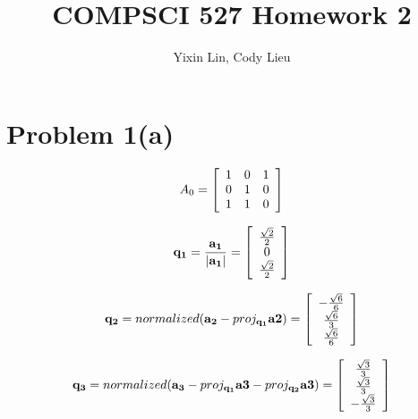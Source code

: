 \documentclass{article}
\author{Yixin Lin, Cody Lieu}
\title{COMPSCI 527 Homework 2}
\newif\ifstays
\begin{document}
\maketitle


\ifstays
\noindent [Please remove all the extra stuff below from the \verb#.tex# file before you hand in the resulting PDF file. However, please leave section headers and \verb#\newline# commands where they are. It is OK to add \verb#\newline# commands if you find that useful, but do so sparingly.

There are two ways to remove this extra stuff. One is to do so physically (look for matching \texttt{START/END}
comments), the other is to change the string \verb#\staystrue# close to the beginning of the file to \verb#\staysfalse#
\fi

\section*{Problem 1(a)}

\[
A_0 = \left[\begin{array}{*{4}c}
 1 & 0 & 1 \\
 0 & 1 & 0 \\
 1 & 1 & 0
 
 \end{array}\right]
\]


$$ \mathbf{q_1} = \frac{\mathbf{a_1}}{|\mathbf{a_1}|} =  \left[ \begin{array} {*{3}c} 
    \frac{\sqrt{2}}{2} \\
    0 \\
    \frac{\sqrt{2}}{2} \\
\end{array}\right]
$$

$$ \mathbf{q_2} = normalized(\mathbf{a_2} - proj_{\mathbf{q_1}}\mathbf{a2}) =  \left[ \begin{array} {*{3}c} 
    -\frac{\sqrt{6}}{6} \\
    \frac{\sqrt{6}}{3} \\
    \frac{\sqrt{6}}{6} \\
\end{array}\right]
$$

$$ \mathbf{q_3} = normalized(\mathbf{a_3} - proj_{\mathbf{q_1}}\mathbf{a3} -
proj_{\mathbf{q_2}}\mathbf{a3}) =  \left[ \begin{array} {*{3}c} 
    \frac{\sqrt{3}}{3} \\
    \frac{\sqrt{3}}{3} \\
    - \frac{\sqrt{3}}{3} \\
\end{array}\right]
$$
\end{document}
